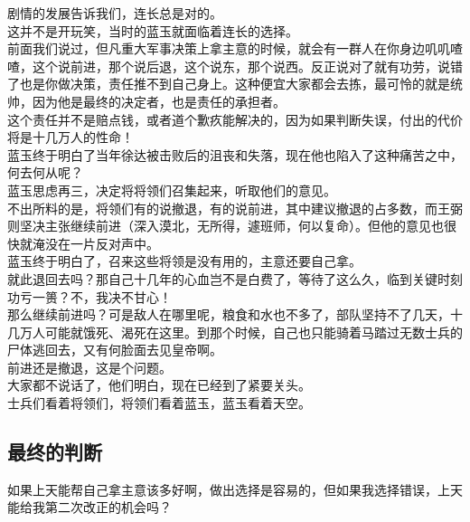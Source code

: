 \begin{multicols}{\theparacolNo}
剧情的发展告诉我们，连长总是对的。\\

这并不是开玩笑，当时的蓝玉就面临着连长的选择。\\

前面我们说过，但凡重大军事决策上拿主意的时候，就会有一群人在你身边叽叽喳喳，这个说前进，那个说后退，这个说东，那个说西。反正说对了就有功劳，说错了也是你做决策，责任推不到自己身上。这种便宜大家都会去拣，最可怜的就是统帅，因为他是最终的决定者，也是责任的承担者。\\

这个责任并不是赔点钱，或者道个歉疚能解决的，因为如果判断失误，付出的代价将是十几万人的性命！\\

蓝玉终于明白了当年徐达被击败后的沮丧和失落，现在他也陷入了这种痛苦之中，何去何从呢？\\

蓝玉思虑再三，决定将将领们召集起来，听取他们的意见。\\

不出所料的是，将领们有的说撤退，有的说前进，其中建议撤退的占多数，而王弼则坚决主张继续前进（深入漠北，无所得，遽班师，何以复命）。但他的意见也很快就淹没在一片反对声中。\\

蓝玉终于明白了，召来这些将领是没有用的，主意还要自己拿。\\

就此退回去吗？那自己十几年的心血岂不是白费了，等待了这么久，临到关键时刻功亏一篑？不，我决不甘心！\\

那么继续前进吗？可是敌人在哪里呢，粮食和水也不多了，部队坚持不了几天，十几万人可能就饿死、渴死在这里。到那个时候，自己也只能骑着马踏过无数士兵的尸体逃回去，又有何脸面去见皇帝啊。\\

前进还是撤退，这是个问题。\\

大家都不说话了，他们明白，现在已经到了紧要关头。\\

士兵们看着将领们，将领们看着蓝玉，蓝玉看着天空。\\

\subsection{最终的判断}
如果上天能帮自己拿主意该多好啊，做出选择是容易的，但如果我选择错误，上天能给我第二次改正的机会吗？\\


\end{multicols}
